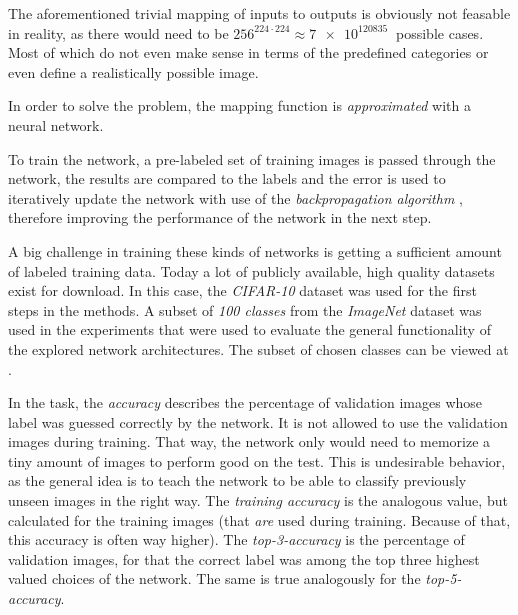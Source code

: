 The aforementioned trivial mapping of inputs to outputs is obviously not feasable in reality, as there would need to be $256^{224\cdot 224} \approx \SI[]{7e120835}[]{}$ possible cases. Most of which do not even make sense in terms of the predefined categories or even define a realistically possible image.

In order to solve the problem, the mapping function is \emph{approximated} with a neural network. 

To train the network, a pre-labeled set of training images is passed through the network, the results are compared to the labels and the error is used to iteratively update the network with use of the \emph{backpropagation algorithm} \cite{machineLearningMitchell}, therefore improving the performance of the network in the next step.

A big challenge in training these kinds of networks is getting a sufficient amount of labeled training data. 
Today a lot of publicly available, high quality datasets exist for download. 
In this case, the \emph{CIFAR-10} \cite{cifarDataset} dataset was used for the first steps in the methods. 
A subset of \emph{100 classes} from the \emph{ImageNet} \cite{imagenetDataset} dataset was used in the experiments that were used to evaluate the general functionality of the explored network architectures.
The subset of chosen classes can be viewed at \cite{selfComputerScience} .

In the task, the \emph{accuracy} describes the percentage of validation images whose label was guessed correctly by the network. It is not allowed to use the validation images during training. That way, the network only would need to memorize a tiny amount of images to perform good on the test. This is undesirable behavior, as the general idea is to teach the network to be able to classify previously unseen images in the right way. The \emph{training accuracy} is the analogous value, but calculated for the training images (that \emph{are} used during training. Because of that, this accuracy is often way higher).
The \emph{top-3-accuracy} is the percentage of validation images, for that the correct label was among the top three highest valued choices of the network. The same is true analogously for the \emph{top-5-accuracy}.